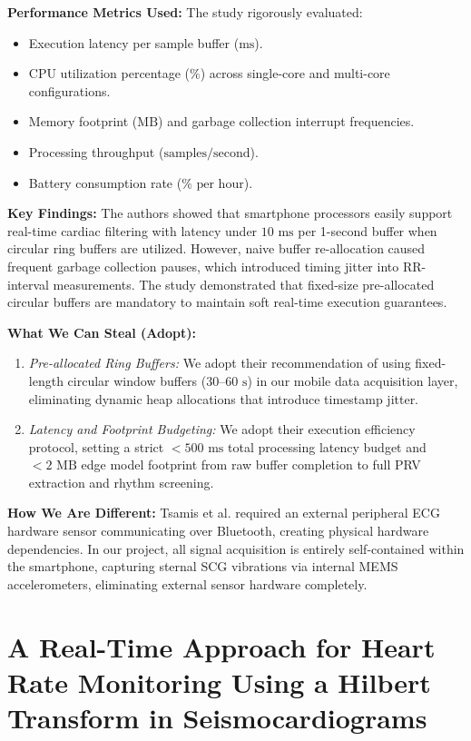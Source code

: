 \textbf{Performance Metrics Used:} The study rigorously evaluated:
\begin{itemize}
    \item Execution latency per sample buffer ($\text{ms}$).
    \item CPU utilization percentage ($\%$) across single-core and multi-core configurations.
    \item Memory footprint ($\text{MB}$) and garbage collection interrupt frequencies.
    \item Processing throughput ($\text{samples/second}$).
    \item Battery consumption rate ($\%\text{ per hour}$).
\end{itemize}

\textbf{Key Findings:} The authors showed that smartphone processors easily support real-time cardiac filtering with latency under $10\text{ ms}$ per 1-second buffer when circular ring buffers are utilized. However, naive buffer re-allocation caused frequent garbage collection pauses, which introduced timing jitter into RR-interval measurements. The study demonstrated that fixed-size pre-allocated circular buffers are mandatory to maintain soft real-time execution guarantees.

\textbf{What We Can Steal (Adopt):}
\begin{enumerate}
    \item \textit{Pre-allocated Ring Buffers:} We adopt their recommendation of using fixed-length circular window buffers ($30\text{--}60\text{ s}$) in our mobile data acquisition layer, eliminating dynamic heap allocations that introduce timestamp jitter.
    \item \textit{Latency and Footprint Budgeting:} We adopt their execution efficiency protocol, setting a strict $< 500\text{ ms}$ total processing latency budget and $< 2\text{ MB}$ edge model footprint from raw buffer completion to full PRV extraction and rhythm screening.
\end{enumerate}

\textbf{How We Are Different:} Tsamis et al. required an external peripheral ECG hardware sensor communicating over Bluetooth, creating physical hardware dependencies. In our project, all signal acquisition is entirely self-contained within the smartphone, capturing sternal SCG vibrations via internal MEMS accelerometers, eliminating external sensor hardware completely.

\newpage
\section{A Real-Time Approach for Heart Rate Monitoring Using a Hilbert Transform in Seismocardiograms \cite{tadi2016realtime}}

